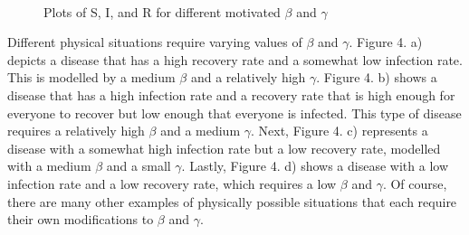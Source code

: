 \documentclass{article}
\begin{document}
\begin{figure}[htbp]
\centering
{}\qquad
{}\\
\qquad
{}
\caption{Plots of S, I, and R for different motivated $\beta$ and $\gamma$}
\label{fig:myfig}
\end{figure}

Different physical situations require varying values of $\beta$ and $\gamma$.
Figure 4. a) depicts a disease that has a high recovery rate and a somewhat low
infection rate. This is modelled by a medium $\beta$ and a relatively high
$\gamma$. Figure 4. b) shows a disease that has a high infection rate and a
recovery rate that is high enough for everyone to recover but low enough that
everyone is infected. This type of disease requires a relatively high $\beta$ and a medium $\gamma$. Next, Figure 4. c) represents a disease with a somewhat high infection rate but
a low recovery rate, modelled with a medium $\beta$ and a small $\gamma$.
Lastly, Figure 4. d) shows a disease with a low infection rate and a low
recovery rate, which requires a low $\beta$ and $\gamma$. Of course, there are
many other examples of physically possible situations that each require their own modifications to $\beta$ and $\gamma$.
\end{document}
